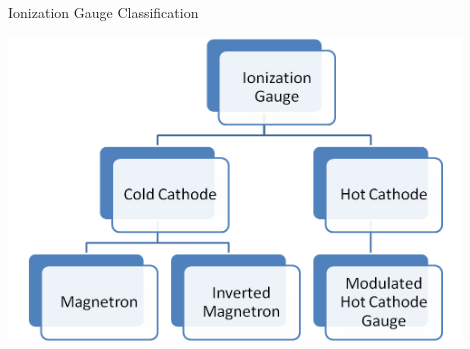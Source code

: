 \documentclass[11pt]{beamer}
\begin{document}
\begin{frame}{Ionization Gauge Classification}

		\begin{center}
			\includegraphics[width=0.9\textwidth]{IG_Classification.png}
		\end{center}


\end{frame}
\end{document}
